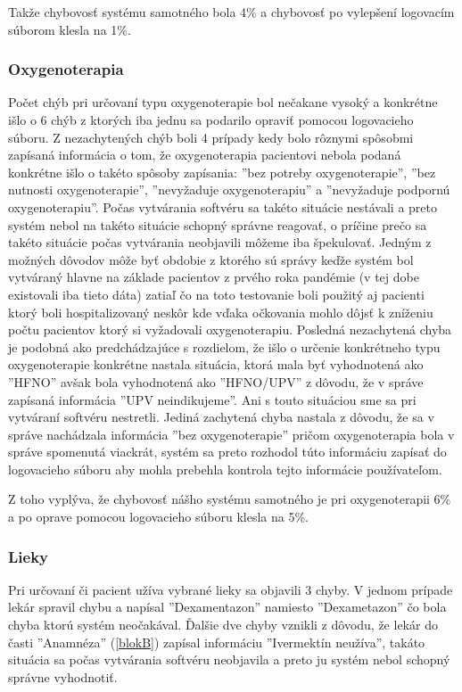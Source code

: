 Takže chybovosť systému samotného bola 4\% a chybovosť po vylepšení logovacím súborom klesla na 1\%.   

\subsubsection{Oxygenoterapia}

Počet chýb pri určovaní typu oxygenoterapie bol nečakane vysoký a konkrétne išlo o 6 chýb z ktorých iba jednu sa podarilo opraviť pomocou logovacieho súboru. Z nezachytených chýb boli 4 prípady kedy bolo rôznymi spôsobmi zapísaná informácia o tom, že oxygenoterapia pacientovi nebola podaná konkrétne išlo o takéto spôsoby zapísania: ''bez potreby oxygenoterapie'', ''bez nutnosti oxygenoterapie'', ''nevyžaduje oxygenoterapiu'' a ''nevyžaduje podpornú oxygenoterapiu''. Počas vytvárania softvéru sa takéto situácie nestávali a preto systém nebol na takéto situácie schopný správne reagovať, o príčine prečo sa takéto situácie počas vytvárania neobjavili môžeme iba špekulovať. Jedným z možných dôvodov môže byť obdobie z ktorého sú správy keďže systém bol vytváraný hlavne na základe pacientov z prvého roka pandémie (v tej dobe existovali iba tieto dáta) zatiaľ čo na toto testovanie boli použitý aj pacienti ktorý boli hospitalizovaný neskôr kde vďaka očkovania mohlo dôjsť k zníženiu počtu pacientov ktorý si vyžadovali oxygenoterapiu. Posledná nezachytená chyba je podobná ako predchádzajúce s rozdielom, že išlo o určenie konkrétneho typu oxygenoterapie konkrétne nastala situácia, ktorá mala byť vyhodnotená ako ''HFNO'' avšak bola vyhodnotená ako ''HFNO/UPV'' z dôvodu, že v správe zapísaná informácia ''UPV neindikujeme''. Ani s touto situáciou sme sa pri vytváraní softvéru nestretli. Jediná zachytená chyba nastala z dôvodu, že sa v správe nachádzala informácia ''bez oxygenoterapie'' pričom oxygenoterapia bola v správe spomenutá viackrát, systém sa preto rozhodol túto informáciu zapísať do logovacieho súboru aby mohla prebehla kontrola tejto informácie používateľom.

Z toho vyplýva, že chybovosť nášho systému samotného je pri oxygenoterapii 6\% a po oprave pomocou logovacieho súboru klesla na 5\%. 

\subsubsection{Lieky}

Pri určovaní či pacient užíva vybrané lieky sa objavili 3 chyby. V jednom prípade lekár spravil chybu a napísal ''Dexamentazon'' namiesto ''Dexametazon'' čo bola chyba ktorú systém neočakával. Ďalšie dve chyby vznikli z dôvodu, že lekár do časti ''Anamnéza'' (\ref{blokB}) zapísal informáciu ''Ivermektín neužíva'', takáto situácia sa počas vytvárania softvéru neobjavila a preto ju systém nebol schopný správne vyhodnotiť.


